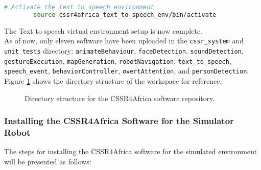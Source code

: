 \documentclass{CSSRforAfrica}
\begin{document}
{\begin{lstlisting}[style=withoutNumbering, language=bash]
		# Activate the text to speech environment
		source cssr4africa_text_to_speech_env/bin/activate
		\end{lstlisting} 
		
		\noindent The Text to speech virtual environment setup is now complete. \\
		
		
		
		\noindent As of now, only eleven software have been uploaded in the \texttt{cssr\_system} and \texttt{unit\_tests} directory: \texttt{animateBehaviour}, \texttt{faceDetection}, \texttt{soundDetection}, \texttt{gestureExecution}, \texttt{mapGeneration}, \texttt{robotNavigation}, \texttt{text\_to\_speech}, \texttt{speech\_event}, \texttt{behaviorController}, \texttt{overtAttention}, and \texttt{personDetection}. \\
		
		\newpage
		\noindent Figure \ref{fig:pepper-robot-workspace-directory} shows the directory structure of the workspace for reference.
		\begin{figure}[H]
			
			{\small 
			}
			
			\caption{Directory structure for the CSSR4Africa software repository.}
			\label{fig:pepper-robot-workspace-directory}
		\end{figure}
		
		\subsubsection{Installing the CSSR4Africa Software for the Simulator Robot}
		\label{sim-soft}
		The steps for installing the CSSR4Africa software for the simulated environment will be presented as follows:
		
}
\end{document}
